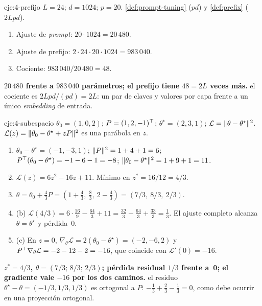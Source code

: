 \begin{solucion}{eje:4-prefijo}
\datos $L=24$; $d=1024$; $p=20$.
\planteamiento \cref{def:prompt-tuning} ($pd$) y \cref{def:prefix} ($2Lpd$).
\pasos
\begin{enumerate}[label=\arabic*.]
  \item Ajuste de \emph{prompt}: $20\cdot 1024=20\,480$.
  \item Ajuste de prefijo: $2\cdot 24\cdot 20\cdot 1024=983\,040$.
  \item Cociente: $983\,040/20\,480=48$.
\end{enumerate}
\resultado \textbf{$20\,480$ frente a $983\,040$ parámetros; el prefijo tiene $48=2L$ veces más.}
\comprobacion el cociente es $2Lpd/(pd)=2L$: un par de claves y valores por capa frente a un único \emph{embedding} de entrada.
\end{solucion}

\begin{solucion}{eje:4-subespacio}
\datos $\theta_0=(1,0,2)$; $P=(1,2,-1)^{\top}$; $\theta^{\star}=(2,3,1)$; $\mathcal{L}=\lVert\theta-\theta^{\star}\rVert^{2}$.
\planteamiento $\mathcal{L}(z)=\lVert\theta_0-\theta^{\star}+zP\rVert^{2}$ es una parábola en $z$.
\pasos
\begin{enumerate}[label=\arabic*.]
  \item $\theta_0-\theta^{\star}=(-1,-3,1)$; $\lVert P\rVert^{2}=1+4+1=6$; $P^{\top}(\theta_0-\theta^{\star})=-1-6-1=-8$; $\lVert\theta_0-\theta^{\star}\rVert^{2}=1+9+1=11$.
  \item $\mathcal{L}(z)=6z^{2}-16z+11$. Mínimo en $z^{\ast}=16/12=4/3$.
  \item $\theta=\theta_0+\frac43P=(1+\frac43,\ \frac83,\ 2-\frac43)=(7/3,\ 8/3,\ 2/3)$.
  \item (b) $\mathcal{L}(4/3)=6\cdot\frac{16}{9}-\frac{64}{3}+11=\frac{32}{3}-\frac{64}{3}+\frac{33}{3}=\frac13$. El ajuste completo alcanza $\theta=\theta^{\star}$ y pérdida~0.
  \item (c) En $z=0$, $\nabla_\theta\mathcal{L}=2(\theta_0-\theta^{\star})=(-2,-6,2)$ y $P^{\top}\nabla_\theta\mathcal{L}=-2-12-2=-16$, que coincide con $\mathcal{L}'(0)=-16$.
\end{enumerate}
\resultado \textbf{$z^{\ast}=4/3$, $\theta=(7/3;\,8/3;\,2/3)$; pérdida residual $1/3$ frente a~0; el gradiente vale $-16$ por los dos caminos.}
\comprobacion el residuo $\theta^{\star}-\theta=(-1/3,1/3,1/3)$ es ortogonal a $P$: $-\frac13+\frac23-\frac13=0$, como debe ocurrir en una proyección ortogonal.
\end{solucion}

